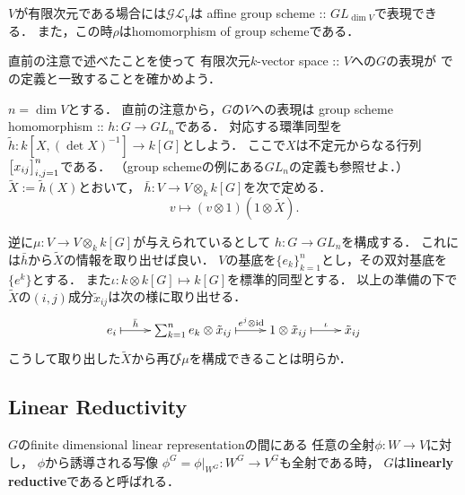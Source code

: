 \documentclass[a4paper]{jsarticle}
\newcommand{\ftorGL}{\mathcal{GL}}
\begin{document}
    \begin{Remark}
        $V$が有限次元である場合には$\ftorGL_V$は
        affine group scheme :: $GL_{\dim V}$で表現できる．
        また，この時$\rho$はhomomorphism of group schemeである．
    \end{Remark}
    \begin{Remark}
        直前の注意で述べたことを使って
        有限次元$k$-vector space :: $V$への$G$の表現が
        \cite{Muk1}での定義と一致することを確かめよう．
        
        $n=\dim V$とする．
        直前の注意から，$G$の$V$への表現は
        group scheme homomorphism :: $h: G \to GL_n$である．
        対応する環準同型を$\tilde{h}: k[X, (\det X)^{-1}] \to k[G]$としよう．
        ここで$X$は不定元からなる行列$\begin{bmatrix} x_{ij} \end{bmatrix}_{i,j=1}^n$である．
        （group schemeの例にある$GL_n$の定義も参照せよ．）
        $\tilde{X}:=\tilde{h}(X)$とおいて，
        $\bar{h}: V \to V \otimes_k k[G]$を次で定める．
        \[ v \mapsto (v \otimes 1)(1 \otimes \tilde{X}). \]
        
        逆に$\mu: V \to V \otimes_k k[G]$が与えられているとして
        $h: G \to GL_n$を構成する．
        これには$\bar{h}$から$\tilde{X}$の情報を取り出せば良い．
        $V$の基底を$\{ e_k \}_{k=1}^n$とし，その双対基底を$\{ e^k \}$とする．
        また$\iota: k \otimes k[G] \mapsto k[G]$を標準的同型とする．
        以上の準備の下で$\tilde{X}$の$(i,j)$成分$\tilde{x}_{ij}$は次の様に取り出せる．
        \[
        \xymatrix
        {
            e_i \ar@{|->}[r]^-{\bar{h}}& 
            \sum_{k=1}^n e_k \otimes \tilde{x}_{ij} \ar@{|->}[r]^-{e^j \otimes \id}&
            1 \otimes \tilde{x}_{ij} \ar@{|->}[r]^-{\iota} &
            \tilde{x}_{ij}
        }
        \]
        こうして取り出した$\tilde{X}$から再び$\mu$を構成できることは明らか．
    \end{Remark}
    \begin{Example}
    \end{Example}

    \subsection{Linear Reductivity}
    \begin{Def}
        $G$のfinite dimensional linear representationの間にある
        任意の全射$\phi: W \to V$に対し，
        $\phi$から誘導される写像
        $\phi^G=\phi|_{W^G}: W^G \to V^G$も全射である時，
        $G$は\textbf{linearly reductive}であると呼ばれる．
    \end{Def}
\end{document}
